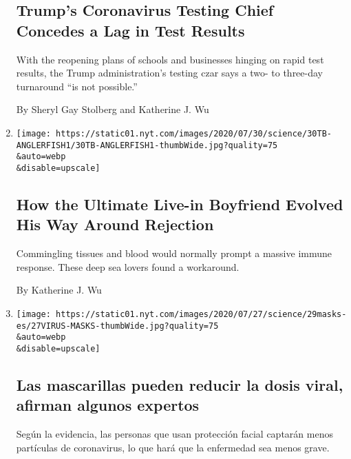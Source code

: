 \begin{enumerate}
  \hypertarget{trumps-coronavirus-testing-chief-concedes-a-lag-in-test-results}{%
  \subsection{Trump's Coronavirus Testing Chief Concedes a Lag in Test
  Results}\label{trumps-coronavirus-testing-chief-concedes-a-lag-in-test-results}}

  With the reopening plans of schools and businesses hinging on rapid
  test results, the Trump administration's testing czar says a two- to
  three-day turnaround ``is not possible.''

  By Sheryl Gay Stolberg and Katherine J. Wu
\item
  \href{/2020/07/30/science/anglerfish-immune-rejection.html}{}

  \texttt{[image: https://static01.nyt.com/images/2020/07/30/science/30TB-ANGLERFISH1/30TB-ANGLERFISH1-thumbWide.jpg?quality=75\\\&auto=webp\\\&disable=upscale]}

  \hypertarget{how-the-ultimate-live-in-boyfriend-evolved-his-way-around-rejection}{%
  \subsection{How the Ultimate Live-in Boyfriend Evolved His Way Around
  Rejection}\label{how-the-ultimate-live-in-boyfriend-evolved-his-way-around-rejection}}

  Commingling tissues and blood would normally prompt a massive immune
  response. These deep sea lovers found a workaround.

  By Katherine J. Wu
\item
  \href{/es/2020/07/29/espanol/ciencia-y-tecnologia/proteccion-cubrebocas-coronavirus.html}{}

  \texttt{[image: https://static01.nyt.com/images/2020/07/27/science/29masks-es/27VIRUS-MASKS-thumbWide.jpg?quality=75\\\&auto=webp\\\&disable=upscale]}

  \hypertarget{las-mascarillas-pueden-reducir-la-dosis-viral-afirman-algunos-expertos}{%
  \subsection{Las mascarillas pueden reducir la dosis viral, afirman
  algunos
  expertos}\label{las-mascarillas-pueden-reducir-la-dosis-viral-afirman-algunos-expertos}}

  Según la evidencia, las personas que usan protección facial captarán
  menos partículas de coronavirus, lo que hará que la enfermedad sea
  menos grave.


\end{enumerate}
